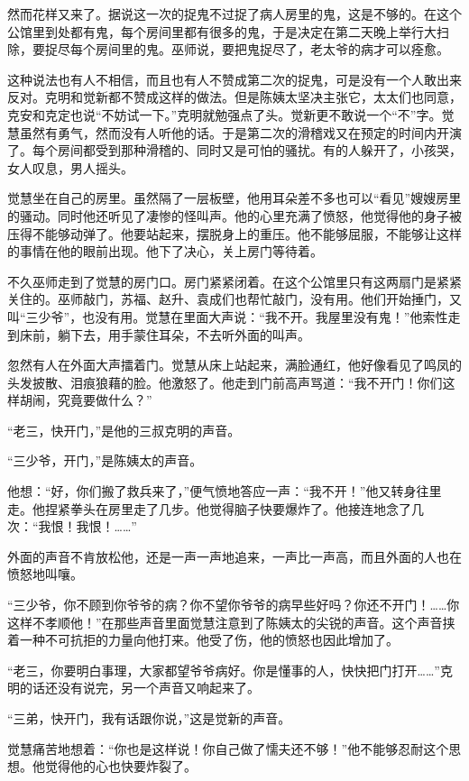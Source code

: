 \par 然而花样又来了。据说这一次的捉鬼不过捉了病人房里的鬼，这是不够的。在这个公馆里到处都有鬼，每个房间里都有很多的鬼，于是决定在第二天晚上举行大扫除，要捉尽每个房间里的鬼。巫师说，要把鬼捉尽了，老太爷的病才可以痊愈。
\par 这种说法也有人不相信，而且也有人不赞成第二次的捉鬼，可是没有一个人敢出来反对。克明和觉新都不赞成这样的做法。但是陈姨太坚决主张它，太太们也同意，克安和克定也说“不妨试一下。”克明就勉强点了头。觉新更不敢说一个“不”字。觉慧虽然有勇气，然而没有人听他的话。于是第二次的滑稽戏又在预定的时间内开演了。每个房间都受到那种滑稽的、同时又是可怕的骚扰。有的人躲开了，小孩哭，女人叹息，男人摇头。
\par 觉慧坐在自己的房里。虽然隔了一层板壁，他用耳朵差不多也可以“看见”嫂嫂房里的骚动。同时他还听见了凄惨的怪叫声。他的心里充满了愤怒，他觉得他的身子被压得不能够动弹了。他要站起来，摆脱身上的重压。他不能够屈服，不能够让这样的事情在他的眼前出现。他下了决心，关上房门等待着。
\par 不久巫师走到了觉慧的房门口。房门紧紧闭着。在这个公馆里只有这两扇门是紧紧关住的。巫师敲门，苏福、赵升、袁成们也帮忙敲门，没有用。他们开始捶门，又叫“三少爷”，也没有用。觉慧在里面大声说：“我不开。我屋里没有鬼！”他索性走到床前，躺下去，用手蒙住耳朵，不去听外面的叫声。
\par 忽然有人在外面大声擂着门。觉慧从床上站起来，满脸通红，他好像看见了鸣凤的头发披散、泪痕狼藉的脸。他激怒了。他走到门前高声骂道：“我不开门！你们这样胡闹，究竟要做什么？”
\par “老三，快开门，”是他的三叔克明的声音。
\par “三少爷，开门，”是陈姨太的声音。
\par 他想：“好，你们搬了救兵来了，”便气愤地答应一声：“我不开！”他又转身往里走。他捏紧拳头在房里走了几步。他觉得脑子快要爆炸了。他接连地念了几次：“我恨！我恨！……”
\par 外面的声音不肯放松他，还是一声一声地追来，一声比一声高，而且外面的人也在愤怒地叫嚷。
\par “三少爷，你不顾到你爷爷的病？你不望你爷爷的病早些好吗？你还不开门！……你这样不孝顺他！”在那些声音里面觉慧注意到了陈姨太的尖锐的声音。这个声音挟着一种不可抗拒的力量向他打来。他受了伤，他的愤怒也因此增加了。
\par “老三，你要明白事理，大家都望爷爷病好。你是懂事的人，快快把门打开……”克明的话还没有说完，另一个声音又响起来了。
\par “三弟，快开门，我有话跟你说，”这是觉新的声音。
\par 觉慧痛苦地想着：“你也是这样说！你自己做了懦夫还不够！”他不能够忍耐这个思想。他觉得他的心也快要炸裂了。
